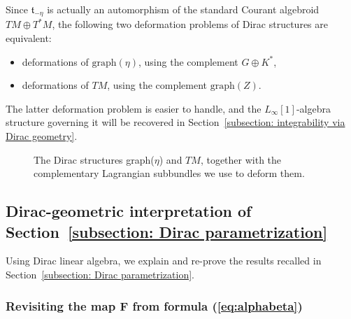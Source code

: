\documentclass[pdftex]{sigma}
\numberwithin{equation}{section}
\renewcommand{\t}{\mathfrak{t}}
\begin{document}
\begin{Remark}\label{Rem:twodefproblems}Since $\t_{-\eta}$ is actually an automorphism of the standard Courant algebroid $TM\oplus T^*M$, the following two deformation problems of Dirac structures are equivalent:
 \begin{itemize}\itemsep=0pt
\item deformations of $\mathrm{graph}(\eta)$, using the complement $G\oplus K^*$,
\item deformations of $TM$, using the complement $\mathrm{graph}(Z)$.
\end{itemize}
The latter deformation problem is easier to handle, and the $L_{\infty}[1]$-algebra structure governing it will be recovered in Section~\ref{subsection: integrability via Dirac geometry}.
\end{Remark}

\begin{figure}[h]\centering
{}
\caption{The Dirac structures graph($\eta$) and $TM$, together with the complementary Lagrangian subbundles we use to deform them.}
\end{figure}

\subsection{Dirac-geometric interpretation of Section~\ref{subsection: Dirac parametrization}}\label{subsection: Dirac-geometric interpretation}

Using Dirac linear algebra, we explain and re-prove the results recalled in Section~\ref{subsection: Dirac parametrization}.

\subsubsection[Revisiting the map $F$ from formula (\ref{eq:alphabeta})]{Revisiting the map $\boldsymbol{F}$ from formula (\ref{eq:alphabeta})}
\end{document}
